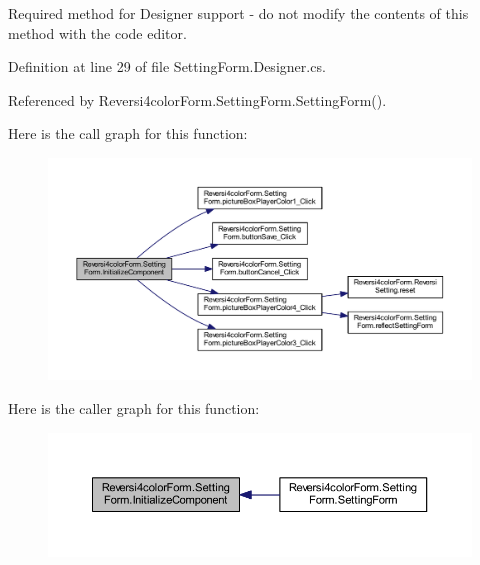 Required method for Designer support -\/ do not modify the contents of this method with the code editor. 



Definition at line 29 of file Setting\+Form.\+Designer.\+cs.



Referenced by Reversi4color\+Form.\+Setting\+Form.\+Setting\+Form().

Here is the call graph for this function\+:\nopagebreak
\begin{figure}[H]
\begin{center}
\leavevmode
\includegraphics[width=350pt]{class_reversi4color_form_1_1_setting_form_a16ffb6338dd99bb75b8b52e8df9fe271_cgraph}
\end{center}
\end{figure}
Here is the caller graph for this function\+:\nopagebreak
\begin{figure}[H]
\begin{center}
\leavevmode
\includegraphics[width=350pt]{class_reversi4color_form_1_1_setting_form_a16ffb6338dd99bb75b8b52e8df9fe271_icgraph}
\end{center}
\end{figure}
\mbox{\label{class_reversi4color_form_1_1_setting_form_a23d56ca250e5a1e9df3895e24ed86a76}} 

